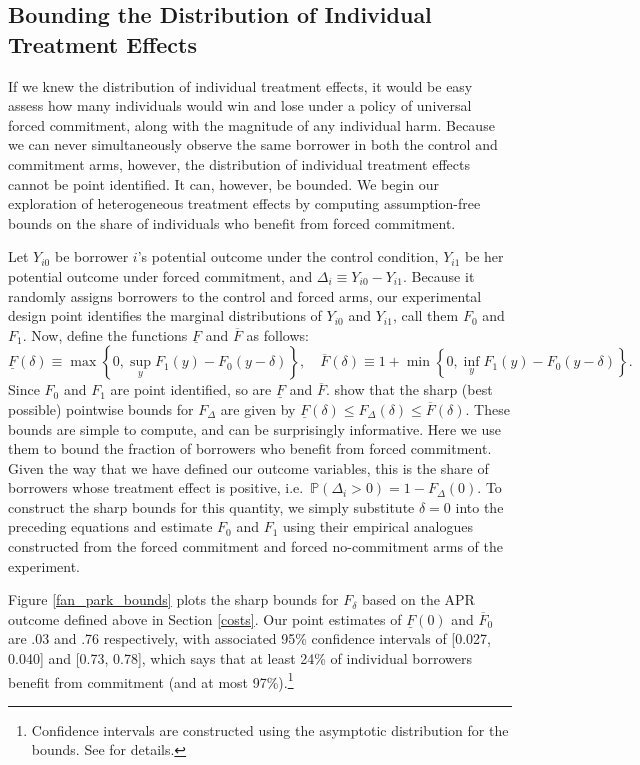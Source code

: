 \documentclass[oneside,11pt]{article}
\begin{document}
\subsection{Bounding the Distribution of Individual Treatment Effects}
\label{sec:bounds}
If we knew the distribution of individual treatment effects, it would be easy assess how many individuals would win and lose under a policy of universal forced commitment, along with the magnitude of any individual harm. 
Because we can never simultaneously observe the same borrower in both the control and commitment arms, however, the distribution of individual treatment effects cannot be point identified.
It can, however, be bounded.
We begin our exploration of heterogeneous treatment effects by computing assumption-free bounds on the share of individuals who benefit from forced commitment. 

Let $Y_{i0}$ be borrower $i$'s potential outcome under the control condition, $Y_{i1}$ be her potential outcome under forced commitment, and $\Delta_i \equiv Y_{i0} - Y_{i1}$.
Because it randomly assigns borrowers to the control and forced arms, our experimental design point identifies the marginal distributions of $Y_{i0}$ and $Y_{i1}$, call them $F_0$ and $F_1$.
Now, define the functions $\underline{F}$ and $\overline{F}$ as follows:
\[
\underline{F}(\delta) \equiv \max \left\{0, \sup_y F_1(y) - F_0(y - \delta)  \right\}, \quad
\overline{F}(\delta) \equiv 1 + \min \left\{0, \inf_y F_1(y) - F_0(y-\delta) \right\}.
\]
Since $F_0$ and $F_1$ are point identified, so are $\underline{F}$ and $\overline{F}$.
\cite{fan2010sharp} show that the sharp (best possible) pointwise bounds for $F_\Delta$ are given by $\underline{F}(\delta) \leq F_\Delta(\delta) \leq \overline{F}(\delta)$.
These bounds are simple to compute, and can be surprisingly informative. 
Here we use them to bound the fraction of borrowers who benefit from forced commitment. 
Given the way that we have defined our outcome variables, this is the share of borrowers whose treatment effect is positive, i.e.\ $\mathbb{P}(\Delta_i > 0) = 1 - F_\Delta(0)$. 
To construct the sharp bounds for this quantity, we simply substitute $\delta = 0$ into the preceding equations and estimate $F_0$ and $F_1$ using their empirical analogues constructed from the forced commitment and forced no-commitment arms of the experiment.

Figure \ref{fan_park_bounds} plots the sharp bounds for $F_{\delta}$ based on the APR outcome defined above in Section \ref{costs}. Our point estimates of $\underline{F}(0)$ and $\overline{F}_0$ are .03 and .76 respectively, with associated 95\% confidence intervals of [0.027, 0.040] and [0.73, 0.78], which says that at least 24\% of individual borrowers benefit from commitment (and at most 97\%).\footnote{Confidence intervals are constructed using the asymptotic distribution for the bounds. See \cite{fan2010sharp} for details.}
\end{document}
